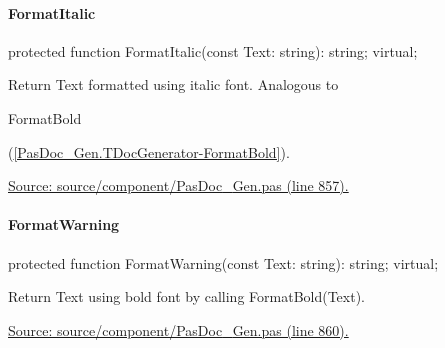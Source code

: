 \documentclass{report}
\newif\ifpdf
\begin{document}
\paragraph*{FormatItalic}\hspace*{\fill}

\label{PasDoc_Gen.TDocGenerator-FormatItalic}
\begin{list}{}{
\setlength{\itemindent}{0cm}
\setlength{\listparindent}{0cm}
\setlength{\leftmargin}{\evensidemargin}
\addtolength{\leftmargin}{\tmplength}
\settowidth{\labelsep}{X}
\addtolength{\leftmargin}{\labelsep}
\setlength{\labelwidth}{\tmplength}
}
\item[\textbf{Declaration}\hfill]
\ifpdf
\begin{flushleft}
\fi
\begin{ttfamily}
protected function FormatItalic(const Text: string): string; virtual;\end{ttfamily}

\ifpdf
\end{flushleft}
\fi

\par
\item[\textbf{Description}]
Return Text formatted using italic font. Analogous to \begin{ttfamily}FormatBold\end{ttfamily}(\ref{PasDoc_Gen.TDocGenerator-FormatBold}).\par
\href{https://github.com/pasdoc/pasdoc/blob/master/source/component/PasDoc_Gen.pas#L857}{Source: source/component/PasDoc{\_}Gen.pas (line 857).}

\end{list}
\paragraph*{FormatWarning}\hspace*{\fill}

\label{PasDoc_Gen.TDocGenerator-FormatWarning}
\begin{list}{}{
\setlength{\itemindent}{0cm}
\setlength{\listparindent}{0cm}
\setlength{\leftmargin}{\evensidemargin}
\addtolength{\leftmargin}{\tmplength}
\settowidth{\labelsep}{X}
\addtolength{\leftmargin}{\labelsep}
\setlength{\labelwidth}{\tmplength}
}
\item[\textbf{Declaration}\hfill]
\ifpdf
\begin{flushleft}
\fi
\begin{ttfamily}
protected function FormatWarning(const Text: string): string; virtual;\end{ttfamily}

\ifpdf
\end{flushleft}
\fi

\par
\item[\textbf{Description}]
Return Text using bold font by calling FormatBold(Text).\par
\href{https://github.com/pasdoc/pasdoc/blob/master/source/component/PasDoc_Gen.pas#L860}{Source: source/component/PasDoc{\_}Gen.pas (line 860).}

\end{list}
\end{document}
